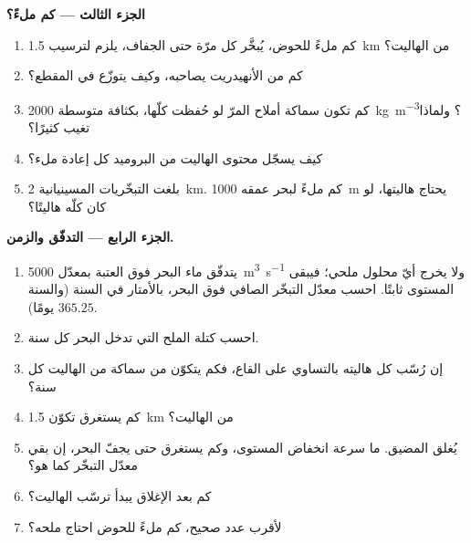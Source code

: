 \begin{problem}
\noindent\textbf{الجزء الثالث --- كم ملءً؟}
\begin{enumerate}[resume]
  \item كم ملءً للحوض، يُبخَّر كل مرّة حتى الجفاف، يلزم لترسيب \qty{1.5}{km} من الهاليت؟
  \item كم من الأنهيدريت يصاحبه، وكيف يتوزّع في المقطع؟
  \item كم تكون سماكة أملاح المرّ لو حُفظت كلّها، بكثافة متوسطة \qty{2000}{kg.m^{-3}}؟ ولماذا تغيب كثيرًا؟
  \item كيف يسجّل محتوى الهاليت من البروميد كل إعادة ملء؟
  \item بلغت التبخّريات المسينيانية \qty{2}{km}. كم ملءً لبحر عمقه \qty{1000}{m} يحتاج هاليتها، لو كان كلّه هاليتًا؟
\end{enumerate}

\noindent\textbf{الجزء الرابع --- التدفّق والزمن.}
\begin{enumerate}[resume]
  \item يتدفّق ماء البحر فوق العتبة بمعدّل \qty{5000}{m^3.s^{-1}} ولا يخرج أيّ محلول ملحي؛ فيبقى المستوى ثابتًا. احسب معدّل التبخّر الصافي فوق البحر، بالأمتار في السنة (والسنة $365.25$ يومًا).
  \item احسب كتلة الملح التي تدخل البحر كل سنة.
  \item إن رُسّب كل هاليته بالتساوي على القاع، فكم يتكوّن من سماكة من الهاليت كل سنة؟
  \item كم يستغرق تكوّن \qty{1.5}{km} من الهاليت؟
  \item يُغلق المضيق. ما سرعة انخفاض المستوى، وكم يستغرق حتى يجفّ البحر، إن بقي معدّل التبخّر كما هو؟
  \item كم بعد الإغلاق يبدأ ترسّب الهاليت؟
  \item لأقرب عدد صحيح، كم ملءً للحوض احتاج ملحه؟
\end{enumerate}
\end{problem}
